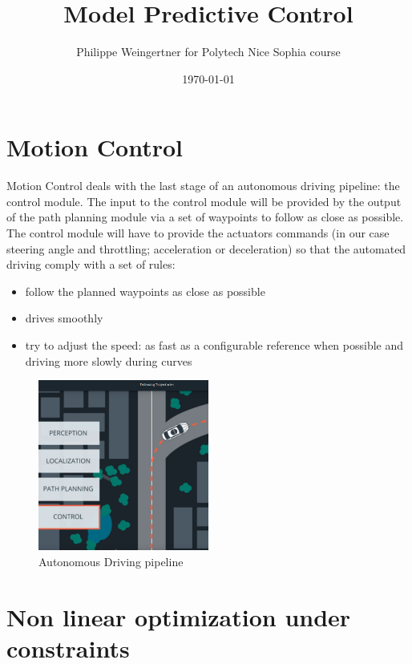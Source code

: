 \documentclass[11pt]{article}
\begin{document}
\title{Model Predictive Control}
\author{Philippe Weingertner for Polytech Nice Sophia course}
\date{\today}
\maketitle

\tableofcontents

\section{Motion Control}

Motion Control deals with the last stage of an autonomous driving pipeline: the control module.
The input to the control module will be provided by the output of the path planning module via a set of waypoints to follow as close as possible.
The control module will have to provide the actuators commands (in our case steering angle and throttling; acceleration or deceleration) so that the automated driving comply with a set of rules:


\begin{itemize}
\item follow the planned waypoints as close as possible
\item drives smoothly
\item try to adjust the speed: as fast as a configurable reference when possible and driving more slowly during curves
\end{itemize}



\begin{figure}[h]
    \centering
    \includegraphics[width=0.5\textwidth]{pipeline}
    \caption{Autonomous Driving pipeline}
    \label{fig:pipeline}
\end{figure}

\section{Non linear optimization under constraints}
\end{document}
